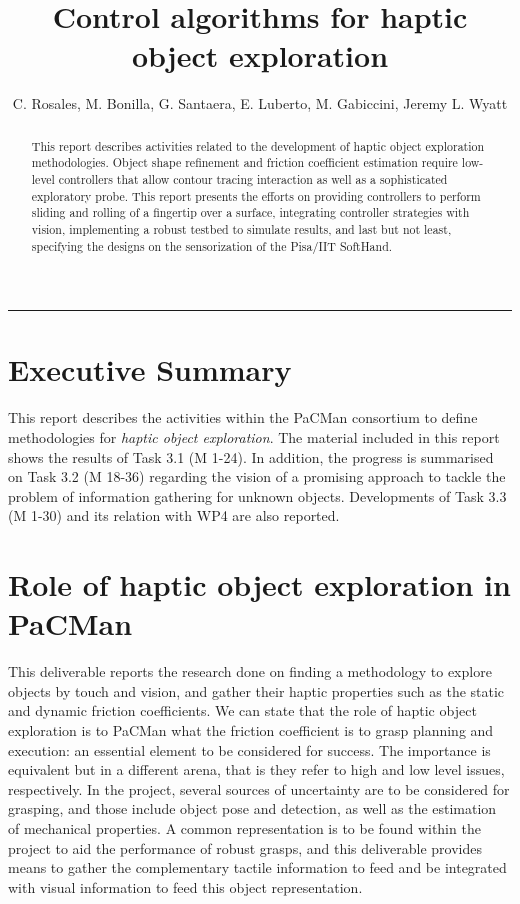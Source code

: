 \documentclass[a4paper,11pt,pdf]{pacmanreport}
\title{Control algorithms for haptic object exploration}
\author{C. Rosales, M. Bonilla, G. Santaera, E. Luberto, M. Gabiccini, Jeremy L. Wyatt}
\begin{document}
\maketitle

\begin{abstract}
\noindent This report describes activities related to the development of haptic object exploration methodologies. Object shape refinement and friction coefficient estimation require low-level controllers that allow contour tracing interaction as well as a sophisticated exploratory probe. This report presents the efforts on providing controllers to perform sliding and rolling of a fingertip over a surface, integrating controller strategies with vision, implementing a robust testbed to simulate results, and last but not least, specifying the designs on the sensorization of the Pisa/IIT SoftHand.
\end{abstract}

\vspace{.2em}
\hrule

\footnotesize

\tableofcontents

\normalsize

\newpage

\section*{Executive Summary}
This report describes the activities within the PaCMan consortium to define methodologies for \emph{haptic object exploration}. The material included in this report shows the results of Task 3.1 (M 1-24). In addition, the progress is summarised on Task 3.2 (M 18-36) regarding the vision of a promising approach to tackle the problem of information gathering for unknown objects. Developments of Task 3.3 (M 1-30) and its relation with WP4 are also reported.

\section*{Role of haptic object exploration in PaCMan}

This deliverable reports the research done on finding a methodology to explore objects by touch and vision, and gather their haptic properties such as the static and dynamic friction coefficients. We can state that the role of haptic object exploration is to PaCMan what the friction coefficient is to grasp planning and execution: an essential element to be considered for success. The importance is equivalent but in a different arena, that is they refer to high and low level issues, respectively. In the project, several sources of uncertainty are to be considered for grasping, and those include object pose and detection, as well as the estimation of mechanical properties. A common representation is to be found within the project to aid the performance of robust grasps, and this deliverable provides means to gather the complementary tactile information to feed and be integrated with visual information to feed this object representation.
\end{document}
